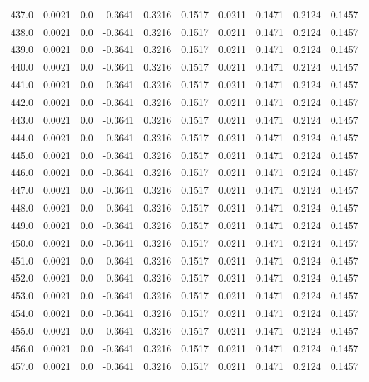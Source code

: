 \begin{longtable}{lrrrrrrrrr}
437.0 & 0.0021 & 0.0 & -0.3641 & 0.3216 & 0.1517 & 0.0211 & 0.1471 & 0.2124 & 0.1457 \\
438.0 & 0.0021 & 0.0 & -0.3641 & 0.3216 & 0.1517 & 0.0211 & 0.1471 & 0.2124 & 0.1457 \\
439.0 & 0.0021 & 0.0 & -0.3641 & 0.3216 & 0.1517 & 0.0211 & 0.1471 & 0.2124 & 0.1457 \\
440.0 & 0.0021 & 0.0 & -0.3641 & 0.3216 & 0.1517 & 0.0211 & 0.1471 & 0.2124 & 0.1457 \\
441.0 & 0.0021 & 0.0 & -0.3641 & 0.3216 & 0.1517 & 0.0211 & 0.1471 & 0.2124 & 0.1457 \\
442.0 & 0.0021 & 0.0 & -0.3641 & 0.3216 & 0.1517 & 0.0211 & 0.1471 & 0.2124 & 0.1457 \\
443.0 & 0.0021 & 0.0 & -0.3641 & 0.3216 & 0.1517 & 0.0211 & 0.1471 & 0.2124 & 0.1457 \\
444.0 & 0.0021 & 0.0 & -0.3641 & 0.3216 & 0.1517 & 0.0211 & 0.1471 & 0.2124 & 0.1457 \\
445.0 & 0.0021 & 0.0 & -0.3641 & 0.3216 & 0.1517 & 0.0211 & 0.1471 & 0.2124 & 0.1457 \\
446.0 & 0.0021 & 0.0 & -0.3641 & 0.3216 & 0.1517 & 0.0211 & 0.1471 & 0.2124 & 0.1457 \\
447.0 & 0.0021 & 0.0 & -0.3641 & 0.3216 & 0.1517 & 0.0211 & 0.1471 & 0.2124 & 0.1457 \\
448.0 & 0.0021 & 0.0 & -0.3641 & 0.3216 & 0.1517 & 0.0211 & 0.1471 & 0.2124 & 0.1457 \\
449.0 & 0.0021 & 0.0 & -0.3641 & 0.3216 & 0.1517 & 0.0211 & 0.1471 & 0.2124 & 0.1457 \\
450.0 & 0.0021 & 0.0 & -0.3641 & 0.3216 & 0.1517 & 0.0211 & 0.1471 & 0.2124 & 0.1457 \\
451.0 & 0.0021 & 0.0 & -0.3641 & 0.3216 & 0.1517 & 0.0211 & 0.1471 & 0.2124 & 0.1457 \\
452.0 & 0.0021 & 0.0 & -0.3641 & 0.3216 & 0.1517 & 0.0211 & 0.1471 & 0.2124 & 0.1457 \\
453.0 & 0.0021 & 0.0 & -0.3641 & 0.3216 & 0.1517 & 0.0211 & 0.1471 & 0.2124 & 0.1457 \\
454.0 & 0.0021 & 0.0 & -0.3641 & 0.3216 & 0.1517 & 0.0211 & 0.1471 & 0.2124 & 0.1457 \\
455.0 & 0.0021 & 0.0 & -0.3641 & 0.3216 & 0.1517 & 0.0211 & 0.1471 & 0.2124 & 0.1457 \\
456.0 & 0.0021 & 0.0 & -0.3641 & 0.3216 & 0.1517 & 0.0211 & 0.1471 & 0.2124 & 0.1457 \\
457.0 & 0.0021 & 0.0 & -0.3641 & 0.3216 & 0.1517 & 0.0211 & 0.1471 & 0.2124 & 0.1457 \\

\end{longtable}
